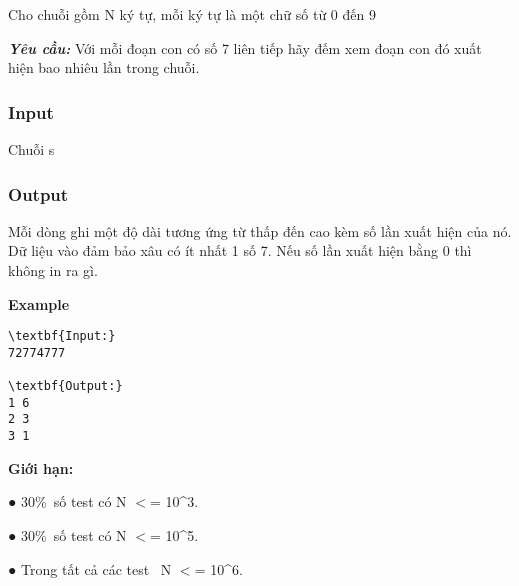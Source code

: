 

Cho chuỗi gồm N ký tự, mỗi ký tự là một chữ số từ 0 đến 9

\textbf{\emph{Yêu cầu: }} Với mỗi đoạn con có số 7 liên tiếp hãy đếm xem đoạn con đó xuất hiện bao nhiêu lần trong chuỗi.

\subsubsection{Input}

Chuỗi s

\subsubsection{Output}

Mỗi dòng ghi một độ dài tương ứng từ thấp đến cao kèm số lần xuất hiện của nó. Dữ liệu vào đảm bảo xâu có ít nhất 1 số 7. Nếu số lần xuất hiện bằng 0 thì không in ra gì.

\textbf{Example }
\begin{verbatim}
\textbf{Input:}
72774777

\textbf{Output:}
1 6
2 3
3 1
\end{verbatim}

\textbf{Giới hạn:}

● 30\% số test có N $<$= 10\textasciicircum3.

● 30\% số test có N $<$= 10\textasciicircum5.

● Trong tất cả các test  N $<$= 10\textasciicircum6.